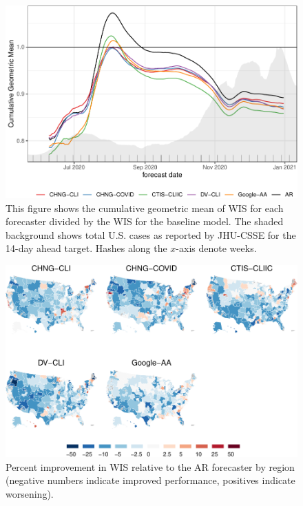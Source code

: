 \documentclass[9pt,twoside,lineno]{pnas-new}
\begin{document}
\clearpage

\begin{figure}

{\centering \includegraphics[width=\textwidth]{fig/cumulative-geo-mean-1} 

}

\caption{This figure shows the cumulative geometric mean of WIS for each forecaster divided by the WIS for the baseline model. The shaded background shows total U.S. cases as reported by JHU-CSSE for the 14-day ahead target. Hashes along the $x$-axis denote weeks.}\label{fig:cumulative-geo-mean}
\end{figure}

\clearpage

\begin{figure}

{\centering \includegraphics[width=\textwidth]{fig/errs-in-space-1} 

}

\caption{Percent improvement in WIS relative to the AR forecaster by region (negative numbers indicate improved performance, positives indicate worsening).}\label{fig:errs-in-space}
\end{figure}
\end{document}
